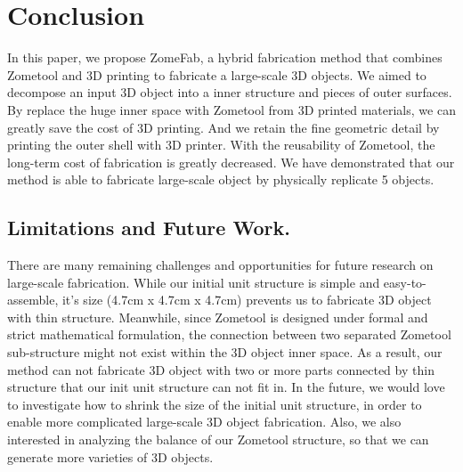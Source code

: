 \section{Conclusion}
\label{sec:conclusion}
In this paper, we propose ZomeFab, a hybrid fabrication method that combines Zometool 
and 3{D} printing to fabricate a large-scale 3{D} objects. 
We aimed to decompose an input 3D object into a inner structure and pieces of outer surfaces. 
By replace the huge inner space with Zometool from 3D printed materials, we can greatly save the cost of 3D printing.
And we retain the fine geometric detail by printing the outer shell with 3D printer.
With the reusability of Zometool, the long-term cost of fabrication is greatly decreased. 
We have demonstrated that our method is able to fabricate large-scale object by physically replicate 5 objects.

\subsection{Limitations and Future Work.}
There are many remaining challenges and opportunities for future research on large-scale fabrication.
While our initial unit structure is simple and easy-to-assemble, it's size (4.7cm x 4.7cm x 4.7cm) prevents us to fabricate 3D object with thin structure.
Meanwhile, since Zometool is designed under formal and strict mathematical formulation, the connection between two separated Zometool sub-structure might not exist within the 3D object inner space.
As a result, our method can not fabricate 3D object with two or more parts connected by thin structure that our init unit structure can not fit in.
In the future, we would love to investigate how to shrink the size of the initial unit structure, in order to enable more complicated large-scale 3D object fabrication.
Also, we also interested in analyzing the balance of our Zometool structure, so that we can generate more varieties of 3D objects.

